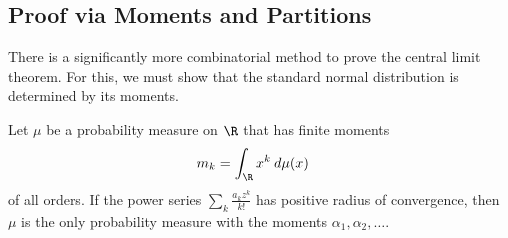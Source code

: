 \documentclass[10pt]{mypackage}
\begin{document}
\subsection{Proof via Moments and Partitions}%
There is a significantly more combinatorial method to prove the central limit theorem. For this, we must show that the standard normal distribution is determined by its moments.
\begin{theorem}
  Let $\mu$ be a probability measure on $\R$ that has finite moments 
  \begin{align*}
    m_k &= \int_{\R}^{} x^{k}\:d\mu(x)
  \end{align*}
  of all orders. If the power series $\sum_{k} \frac{a_k z^{k}}{k!}$ has positive radius of convergence, then $\mu$ is the only probability measure with the moments $\alpha_1,\alpha_2,\dots$.
\end{theorem}
\end{document}
